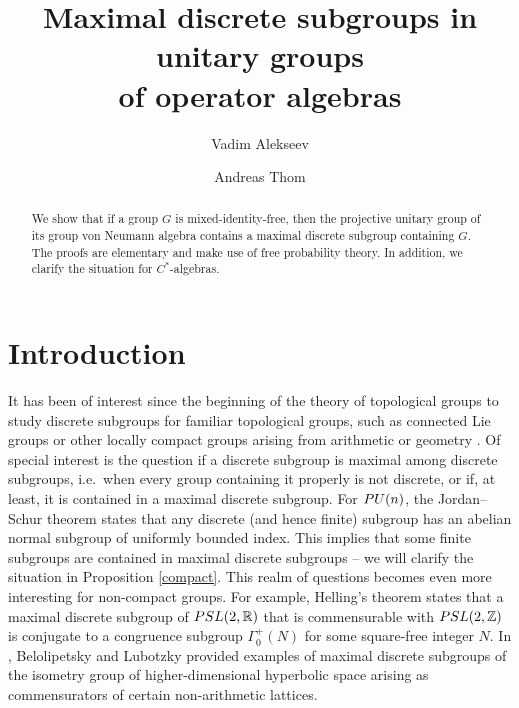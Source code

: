 \documentclass[11pt]{amsproc}
\author{Vadim Alekseev}
\author{Andreas Thom}
\title[Maximal discrete subgroups]{Maximal discrete subgroups in  unitary groups \\ of operator algebras}
\theoremstyle{plain}
\theoremstyle{remark}
\begin{document}
\onehalfspace

\begin{abstract}
We show that if a group $G$ is mixed-identity-free, then the projective unitary group of its group von Neumann algebra contains a maximal discrete subgroup containing $G$. The proofs are elementary and make use of free probability theory. In addition, we clarify the situation for $C^*$-algebras.
\end{abstract}

\maketitle

\section{Introduction}

It has been of interest since the beginning of the theory of topological groups to study discrete subgroups for familiar topological groups, such as connected Lie groups or other locally compact groups arising from arithmetic or geometry \cites{MR29918, MR374340, MR0209363,MR212021,MR2198218,MR41145,MR171781}.  Of special interest is the question if a discrete subgroup is maximal among discrete subgroups, i.e.\ when every group containing it properly is not discrete, or if, at least, it is contained in a maximal discrete subgroup. For ${\rm PU}(n)$, the Jordan--Schur theorem states that any discrete (and hence finite) subgroup has an abelian normal subgroup of uniformly bounded index. This implies that some finite subgroups are contained in maximal discrete subgroups -- we will clarify the situation in Proposition \ref{compact}. This realm of questions becomes even more interesting for non-compact groups. For example, Helling's theorem \cite{MR228437} states that a maximal discrete subgroup of ${\rm PSL}(2,\mathbb R)$ that is commensurable with ${\rm PSL}(2,\mathbb Z)$ is conjugate to a congruence subgroup $\Gamma^+_0(N)$ for some square-free integer $N$. In \cite{MR2198218}, Belolipetsky and Lubotzky provided examples of maximal discrete subgroups of the isometry group of higher-dimensional hyperbolic space arising as commensurators of certain non-arithmetic lattices. 
\end{document}
